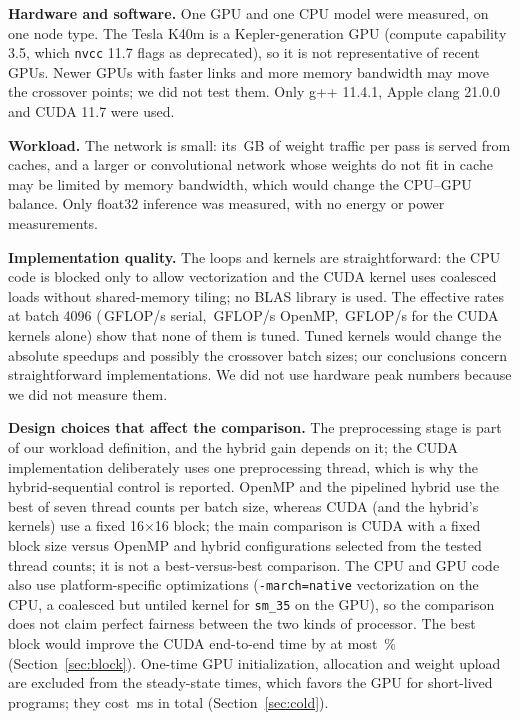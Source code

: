 \textbf{Hardware and software.} One GPU and one CPU model were measured, on one node type. The Tesla K40m is a Kepler-generation GPU (compute capability 3.5, which \texttt{nvcc} 11.7 flags as deprecated), so it is not representative of recent GPUs. Newer GPUs with faster links and more memory bandwidth may move the crossover points; we did not test them. Only g++ 11.4.1, Apple clang 21.0.0 and CUDA 11.7 were used.

\textbf{Workload.} The network is small: its \,GB of weight traffic per pass is served from caches, and a larger or convolutional network whose weights do not fit in cache may be limited by memory bandwidth, which would change the CPU--GPU balance. Only float32 inference was measured, with no energy or power measurements.

\textbf{Implementation quality.} The loops and kernels are straightforward: the CPU code is blocked only to allow vectorization and the CUDA kernel uses coalesced loads without shared-memory tiling; no BLAS library is used. The effective rates at batch 4096 (\,GFLOP/s serial, \,GFLOP/s OpenMP, \,GFLOP/s for the CUDA kernels alone) show that none of them is tuned. Tuned kernels would change the absolute speedups and possibly the crossover batch sizes; our conclusions concern straightforward implementations. We did not use hardware peak numbers because we did not measure them.

\textbf{Design choices that affect the comparison.} The preprocessing stage is part of our workload definition, and the hybrid gain depends on it; the CUDA implementation deliberately uses one preprocessing thread, which is why the hybrid-sequential control is reported. OpenMP and the pipelined hybrid use the best of seven thread counts per batch size, whereas CUDA (and the hybrid's kernels) use a fixed 16$\times$16 block; the main comparison is CUDA with a fixed block size versus OpenMP and hybrid configurations selected from the tested thread counts; it is not a best-versus-best comparison. The CPU and GPU code also use platform-specific optimizations (\texttt{-march=native} vectorization on the CPU, a coalesced but untiled kernel for \texttt{sm\_35} on the GPU), so the comparison does not claim perfect fairness between the two kinds of processor. The best block would improve the CUDA end-to-end time by at most \,\% (Section~\ref{sec:block}). One-time GPU initialization, allocation and weight upload are excluded from the steady-state times, which favors the GPU for short-lived programs; they cost \,ms in total (Section~\ref{sec:cold}).

